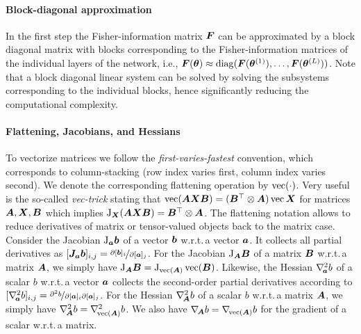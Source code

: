 \paragraph{Block-diagonal approximation}
In the first step the Fisher-information matrix ${\bm{F}}$ can be approximated by a block diagonal matrix with blocks corresponding to the Fisher-information matrices of the individual layers of the network, i.e., ${\bm{F}}({\bm{\theta}}) \approx \operatorname{diag}({\bm{F}}({\bm{\theta}}^{(1)}), \dots, {\bm{F}}({\bm{\theta}}^{(L)}))$. 
Note that a block diagonal linear system can be solved by solving the subsystems corresponding to the individual blocks, hence significantly reducing the computational complexity. 

\paragraph{Flattening, Jacobians, and Hessians}
To vectorize %
matrices %
we follow the %
\emph{first-varies-fastest} convention, which corresponds to column-stacking (row index varies first, column index varies second).
We denote the corresponding flattening operation by $\operatorname{vec}(\cdot)$.
Very useful is the so-called \emph{vec-trick} stating that $\operatorname{vec}({\bm{A}}{\bm{X}}{\bm{B}}) = ({\bm{B}}^\top\otimes {\bm{A}})\operatorname{vec}{{\bm{X}}}$
for matrices ${\bm{A}}, {\bm{X}}, {\bm{B}}$ %
which implies $\mathrm{J}_{\bm{X}}({\bm{A}}{\bm{X}}{\bm{B}}) = {\bm{B}}^\top\otimes {\bm{A}}$.
The flattening notation allows to reduce derivatives of matrix or tensor-valued objects back to the matrix case.
Consider the Jacobian $\mathrm{J}_{{\bm{a}}}{\bm{b}}$ of a vector ${\bm{b}}$ w.r.t.\,a vector ${\bm{a}}$.
It collects all partial derivatives as $[{\bm{J}}_{{\bm{a}}}{\bm{b}}]_{i,j} = \nicefrac{\partial [{\bm{b}}]_i}{\partial [{\bm{a}}]_j}$.
For the Jacobian $\mathrm{J}_{{\bm{A}}}{\bm{B}}$ of a matrix ${\bm{B}}$ w.r.t.\,a matrix ${\bm{A}}$, we simply have $\mathrm{J}_{{\bm{A}}} {\bm{B}} = \mathrm{J}_{\operatorname{vec}( {\bm{A}} )}\operatorname{vec}({\bm{B}})$.
Likewise, the Hessian $\nabla_{\!{{\bm{a}}}}^{2}b$ of a scalar $b$ w.r.t.\,a vector ${\bm{a}}$ collects the second-order partial derivatives according to $[\nabla_{\!{{\bm{a}}}}^{2}b]_{i,j} = \nicefrac{\partial^2 b}{\partial [{\bm{a}}]_i \partial [{\bm{a}}]_j}$.
For the Hessian $\nabla_{\!{{\bm{A}}}}^{2} b$ of a scalar $b$ w.r.t.\,a matrix ${\bm{A}}$, we simply have $\nabla_{\!{{\bm{A}}}}^{2} b = \nabla_{\!{\operatorname{vec}({\bm{A}})}}^{2}b$.
We also have $\nabla_{\!{{\bm{A}}}} b = \nabla_{\!{\operatorname{vec}({\bm{A}})}} b$ for the gradient of a scalar w.r.t.\,a matrix.

